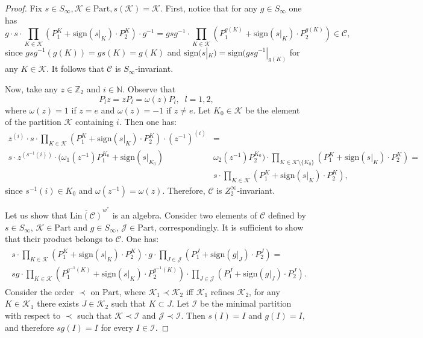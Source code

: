 \documentclass[11pt]{amsart}
\newcommand{\ie}{\text{i.e.\;}}
\newcommand{\sign}{\mathrm{sign}}
\newcommand{\Part}{\mathrm{Part}}
\newcommand{\Lin}{\mathrm{Lin}}
\theoremstyle{plain}
\theoremstyle{definition}
\theoremstyle{remark}
\numberwithin{equation}{section}
\begin{document}
 \begin{proof} 
 	Fix $s\in S_\infty,\mathcal K\in\mathrm{Part}, s(\mathcal K)=\mathcal K$. First, notice that for any $g\in S_\infty$ one has $$g\cdot s\cdot\prod\limits_{K\in\mathcal K}(P_1^K+\sign(s|_K)\cdot P_2^K)\cdot g^{-1}=gsg^{-1}\cdot \prod\limits_{K\in\mathcal K}(P_1^{g(K)}+\sign(s|_K)\cdot P_2^{g(K)})\in\mathcal C,$$ since $gsg^{-1}(g(K))=gs(K)=g(K)$ and $\sign(s|_{K})=\sign(gsg^{-1}|_{g(K)}$ for any $K\in\mathcal K$. It follows that $\mathcal C$ is $S_\infty$-invariant.
 	
 
Now, take any $z\in\mathbb Z_2$ and $i\in\mathbb N$. Observe that 
 \begin{equation}\label{eq: P_lz}
 	P_lz=zP_l=\omega(z)P_l,\;\;l=1,2,
 \end{equation}
 where $\omega(z)=1$ if $z=e$ and $\omega(z)=-1$ if $z\neq e$. Let $K_0\in\mathcal K$ be the element of the partition $\mathcal K$ containing $i$. Then one has:
 \begin{align*}
 	z^{(i)}\cdot s\cdot\prod\limits_{K\in\mathcal K}(P_1^K+\sign(s|_K)\cdot P_2^K)\cdot (z^{-1})^{(i)}&=
 	\\  s \cdot z^{(s^{-1}(i))}\cdot (\omega_1(z^{-1})P_1^{K_0}+\sign(s|_{K_0})&\omega_2(z^{-1})P_2^{K_0})\cdot \prod\limits_{K\in\mathcal K\setminus\{K_0\}}(P_1^K+\sign(s|_K)\cdot P_2^K) =\\&s\cdot\prod\limits_{K\in\mathcal K}(P_1^K+\sign(s|_K)\cdot P_2^K),
 \end{align*} since $s^{-1}(i)\in K_0$ and $\omega(z^{-1})=\omega(z)$. Therefore, $\mathcal C$ is $Z_2^\infty$-invariant. 
 
 Let us show that $\overline{\Lin(\mathcal C)}^{w^*}$ is an algebra. Consider two elements of $\mathcal C$ defined by $s\in S_\infty$, $\mathcal K\in\Part$ and $g\in S_\infty$, $\mathcal J\in\Part$, correspondingly. It is sufficient to show that their product belongs to $\mathcal C$. One has:
 \begin{align}\label{eq: product in mathcal C}\begin{split}s\cdot\prod\limits_{K\in\mathcal K}(P_1^K+\sign(s|_K)\cdot P_2^K)\cdot g\cdot\prod\limits_{J\in\mathcal J}(P_1^J+\sign(g|_J)\cdot P_2^J)=\\ sg\cdot\prod\limits_{K\in\mathcal K}(P_1^{g^{-1}(K)}+\sign(s|_K)\cdot P_2^{g^{-1}(K)})\cdot \prod\limits_{J\in\mathcal J}(P_1^J+\sign(g|_J)\cdot P_2^J).\end{split}
 \end{align} Consider the order $\prec$ on $\Part$, where $\mathcal K_1\prec\mathcal K_2$ iff $\mathcal K_1$ refines $\mathcal K_2$, \ie for any $K\in\mathcal K_1$ there exists $J\in\mathcal K_2$ such that $K\subset J$. Let $\mathcal I$ be the minimal partition with respect to $\prec$ such that $\mathcal K\prec \mathcal I$ and $\mathcal J\prec\mathcal I$. Then $s(I)=I$ and $g(I)=I$, and therefore $sg(I)=I$  for every $I\in\mathcal I$.
 

\end{proof}
\end{document}
